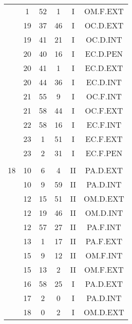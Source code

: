 \documentclass[12pt, a4paper]{article}
\begin{document}
\begin{multicols}{3}
{\begin{tabular}{c c c c c c}
	 	 	 	 & 1 & 52 & 1 & I & OM.F.EXT\\%
	 	 	 	 & 19 & 37 & 46 & I & OC.D.EXT\\%
	 	 	 	 & 19 & 41 & 21 & I & OC.D.INT\\%
	 	 	 	 & 20 & 40 & 16 & I & EC.D.PEN\\%
	 	 	 	 & 20 & 41 & 1 & I & EC.D.EXT\\%
	 	 	 	 & 20 & 44 & 36 & I & EC.D.INT\\%
	 	 	 	 & 21 & 55 & 9 & I & OC.F.INT\\%
	 	 	 	 & 21 & 58 & 44 & I & OC.F.EXT\\%
	 	 	 	 & 22 & 58 & 16 & I & EC.F.INT\\%
	 	 	 	 & 23 & 1 & 51 & I & EC.F.EXT\\%
	 	 	 	 & 23 & 2 & 31 & I & EC.F.PEN\\%
	 	 	 	 & & & & & \\%
	 	 	 	18 & 10 & 6 & 4 & II & PA.D.EXT\\%
	 	 	 	 & 10 & 9 & 59 & II & PA.D.INT\\%
	 	 	 	 & 12 & 15 & 51 & II & OM.D.EXT\\%
	 	 	 	 & 12 & 19 & 46 & II & OM.D.INT\\%
	 	 	 	 & 12 & 57 & 27 & II & PA.F.INT\\%
	 	 	 	 & 13 & 1 & 17 & II & PA.F.EXT\\%
	 	 	 	 & 15 & 9 & 12 & II & OM.F.INT\\%
	 	 	 	 & 15 & 13 & 2 & II & OM.F.EXT\\%
	 	 	 	 & 16 & 58 & 25 & I & PA.D.EXT\\%
	 	 	 	 & 17 & 2 & 0 & I & PA.D.INT\\%
	 	 	 	 & 18 & 0 & 2 & I & OM.D.EXT\\%

\end{tabular}}
\end{multicols}
\end{document}
